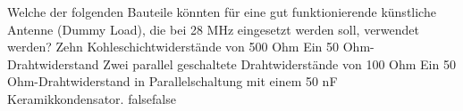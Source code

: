     {Welche der folgenden Bauteile könnten für eine gut funktionierende künstliche Antenne (Dummy Load), die bei 28 MHz eingesetzt werden soll, verwendet werden?}
    {Zehn Kohleschichtwiderstände von 500 Ohm}
    {Ein 50 Ohm-Drahtwiderstand}
    {Zwei parallel geschaltete Drahtwiderstände von 100 Ohm}
    {Ein 50 Ohm-Drahtwiderstand in Parallelschaltung mit einem 50 nF Keramikkondensator.}
    {false}{false}